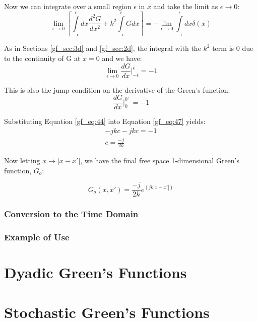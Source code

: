 \noindent Now we can integrate over a small region $\epsilon$ in $x$ and take the limit as $\epsilon \rightarrow 0$:
\begin{equation}
\lim_{\epsilon\to 0} \left[\int\limits_{-\epsilon}^{\epsilon}dx \frac{d^2G}{dx^2}+ k^2\int\limits_{-\epsilon}^{\epsilon}Gdx  \right] = -\lim_{\epsilon\to 0}\int\limits_{-\epsilon}^{\epsilon}dx \delta(x)
\label{gf_eq:45}
\end{equation}
\renewcommand{\baselinestretch}{2} \small\normalsize

As in Sections \ref{gf_sec:3d} and \ref{gf_sec:2d}, the integral with the $k^2$ term is $0$ due to the continuity of G at $x=0$ and we have:
\begin{equation}
\lim_{\epsilon\to 0}  \frac{dG}{dx}\bigg|_{-\epsilon}^{\epsilon} = -1 
\label{gf_eq:46}
\end{equation}
\renewcommand{\baselinestretch}{2} \small\normalsize

\noindent This is also the jump condition on the derivative of the Green's function:
\begin{equation}
\frac{dG}{dx}\bigg|_{0^-}^{0^+} = -1 
\label{gf_eq:47}
\end{equation}
\renewcommand{\baselinestretch}{2} \small\normalsize

\noindent Substituting Equation \ref{gf_eq:44} into Equation \ref{gf_eq:47} yields:
\begin{equation}
\begin{gathered}
-jkc- jkc= -1 \\
c = \frac{-j}{2k}
\end{gathered}
\label{gf_eq:48}
\end{equation}
\renewcommand{\baselinestretch}{2} \small\normalsize

Now letting $x \rightarrow |x-x'|$, we have the final free space 1-dimensional Green's function, $G_o$:

\begin{equation}
\boxed{G_o\left(x,x'\right) = \frac{-j}{2k}e^{(jk|x - x' | )}}
\label{gf_eq:49}
\end{equation}
\renewcommand{\baselinestretch}{2} \small\normalsize

\subsubsection{Conversion to the Time Domain}

\subsubsection{Example of Use}

\section{Dyadic Green's Functions}


\section{Stochastic Green's Functions}


